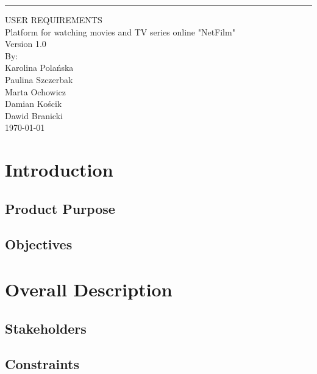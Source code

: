 \documentclass{scrreprt}
\date{}
\def\myversion{1.0 }
\begin{document}
\begin{flushright}
    \rule{16cm}{5pt}\vskip1cm
    \begin{bfseries}
        \Huge{USER REQUIREMENTS}\\
        \vspace{4cm}
        Platform for watching movies and TV series online "NetFilm"\\
        \vspace{1cm}
        \LARGE{Version \myversion}\\
        \vspace{1cm}
        By:\\
        Karolina Polańska\\
        Paulina Szczerbak\\
        Marta Ochowicz\\
        Damian Kościk\\
        Dawid Branicki\\
        \vspace{3cm}
        \today\\
    \end{bfseries}
\end{flushright}

\tableofcontents

\chapter{Introduction}

\section{Product Purpose}

\section{Objectives}

\chapter{Overall Description}

\section{Stakeholders}

\section{Constraints}
\end{document}
